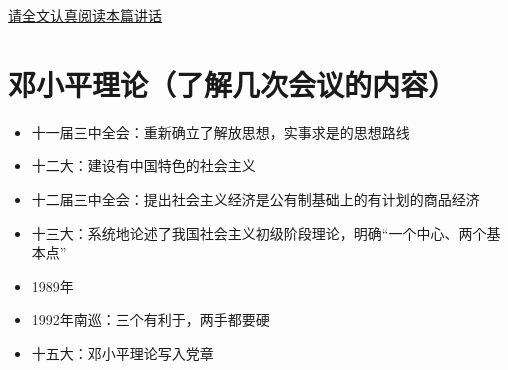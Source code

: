\documentclass[a4paper, UTF8]{ctexart}
\begin{document}
    \href{http://www.xinhuanet.com//politics/2013-12/26/c_118723453.htm}{请全文认真阅读本篇讲话}

\section{邓小平理论（了解几次会议的内容）}
    \begin{itemize}
        \item 十一届三中全会：重新确立了解放思想，实事求是的思想路线
        \item 十二大：建设有中国特色的社会主义
        \item 十二届三中全会：提出社会主义经济是公有制基础上的有计划的商品经济
        \item 十三大：系统地论述了我国社会主义初级阶段理论，明确“一个中心、两个基本点”
        \item 1989年
        \item 1992年南巡：三个有利于，两手都要硬
        \item 十五大：邓小平理论写入党章
    \end{itemize}
\end{document}
